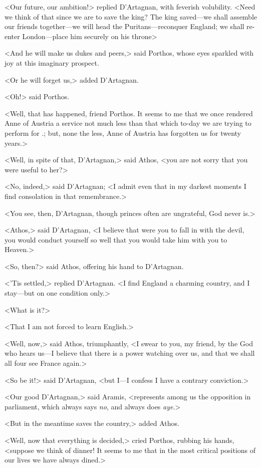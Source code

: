 <Our future, our ambition!> replied D'Artagnan, with feverish volubility. <Need we think of that since we are to save the king? The king saved—we shall assemble our friends together—we will head the Puritans—reconquer England; we shall re-enter London—place him securely on his throne\longdash>

<And he will make us dukes and peers,> said Porthos, whose eyes sparkled with joy at this imaginary prospect.

<Or he will forget us,> added D'Artagnan.

<Oh!> said Porthos.

<Well, that has happened, friend Porthos. It seems to me that we once rendered Anne of Austria a service not much less than that which to-day we are trying to perform for .; but, none the less, Anne of Austria has forgotten us for twenty years.>

<Well, in spite of that, D'Artagnan,> said Athos, <you are not sorry that you were useful to her?>

<No, indeed,> said D'Artagnan; <I admit even that in my darkest moments I find consolation in that remembrance.>

<You see, then, D'Artagnan, though princes often are ungrateful, God never is.>

<Athos,> said D'Artagnan, <I believe that were you to fall in with the devil, you would conduct yourself so well that you would take him with you to Heaven.>

<So, then?> said Athos, offering his hand to D'Artagnan.

<'Tis settled,> replied D'Artagnan. <I find England a charming country, and I stay—but on one condition only.>

<What is it?>

<That I am not forced to learn English.>

<Well, now,> said Athos, triumphantly, <I swear to you, my friend, by the God who hears us—I believe that there is a power watching over us, and that we shall all four see France again.>

<So be it!> said D'Artagnan, <but I—I confess I have a contrary conviction.>

<Our good D'Artagnan,> said Aramis, <represents among us the opposition in parliament, which always says \emph{no}, and always does \emph{aye}.>

<But in the meantime saves the country,> added Athos.

<Well, now that everything is decided,> cried Porthos, rubbing his hands, <suppose we think of dinner! It seems to me that in the most critical positions of our lives we have always dined.>

